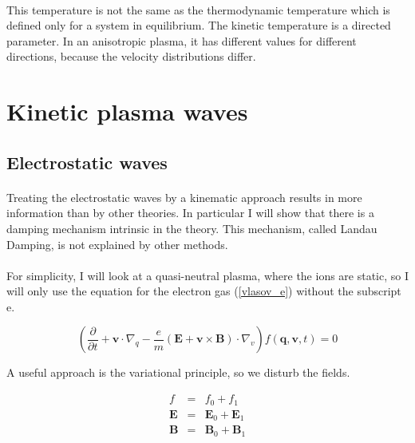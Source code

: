 \documentclass[a4paper,10pt]{report}
\begin{document}
\paragraph*{}
This temperature is not the same as the thermodynamic temperature which is defined only for a system in equilibrium. The kinetic temperature is a directed parameter. In an anisotropic plasma, it has different values for different directions, because the velocity distributions differ.


\section{Kinetic plasma waves}

\subsection{Electrostatic waves}
\paragraph*{}
Treating the electrostatic waves by a kinematic approach results in more information than by other theories. In particular I will show that there is a damping mechanism intrinsic in the theory. This mechanism, called Landau Damping, is not explained by other methods.

\paragraph*{}
For simplicity, I will look at a quasi-neutral plasma, where the ions are static, so I will only use the equation for the electron gas (\ref{vlasov_e}) without the subscript e.

\begin{equation}
    \left( \frac{\partial}{\partial t} + \mathbf{v}\cdot \nabla_q-\frac{e}{m}(\mathbf{E}+\mathbf{v}\times \mathbf{B})\cdot\nabla_v \right) f(\mathbf{q,v},t) = 0
\end{equation}

A useful approach is the variational principle, so we disturb the fields.

\begin{eqnarray}
  f &=& f_0+f_1 \\
\mathbf{E} &=& \mathbf{E}_0+\mathbf{E}_1 \\
\mathbf{B} &=& \mathbf{B}_0+\mathbf{B}_1\end{eqnarray}
\end{document}
